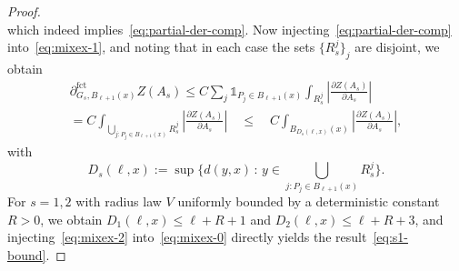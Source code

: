 \documentclass[10pt]{amsart}
\theoremstyle{definition}\newtheorem{defi}[theo]{Definition}\newtheorem{rema}[theo]{Remark}\newtheorem{exam}[theo]{Example}\newtheorem{exem}[theo]{Example}\newtheorem{nota}[theo]{Notation}
\newcommand{\parfct}[1]{\partial_{#1}^{\operatorname{fct}}}
\begin{document}
\begin{proof}
\[\]
which indeed implies~\eqref{eq:partial-der-comp}. Now injecting~\eqref{eq:partial-der-comp} into~\eqref{eq:mixex-1}, and noting that in each case the sets $\{R_s^j\}_j$ are disjoint, we obtain
\begin{multline}\label{eq:mixex-2}
\parfct{G_s,B_{\ell+1}(x)}Z(A_s)\le C\sum_j\mathds1_{P_j\in B_{\ell+1}(x)}\int_{R_s^j}\left|\frac{\partial Z(A_s)}{\partial A_s}\right|\\
=C\int_{\bigcup_{j:P_j\in B_{\ell+1}(x)}R_s^j}\left|\frac{\partial Z(A_s)}{\partial A_s}\right|\quad
\le\quad C\int_{B_{D_s(\ell,x)}(x)}\left|\frac{\partial Z(A_s)}{\partial A_s}\right|,
\end{multline}
with
\[
D_s(\ell,x):=\sup\Big\{d(y,x)\,:\,y\in \bigcup_{j:P_j\in B_{\ell+1}(x)}R_s^j\Big\}.
\]
For $s=1,2$ with radius law $V$ uniformly bounded by a deterministic constant $R>0$, we obtain $D_1(\ell,x)\le\ell+R+1$ and $D_2(\ell,x)\le\ell+R+3$, and injecting~\eqref{eq:mixex-2} into~\eqref{eq:mixex-0} directly yields the result~\eqref{eq:s1-bound}.


\end{proof}
\end{document}
